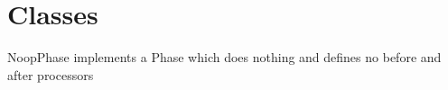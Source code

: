 \section{Classes}

NoopPhase implements a Phase which does nothing and defines no before and after processors